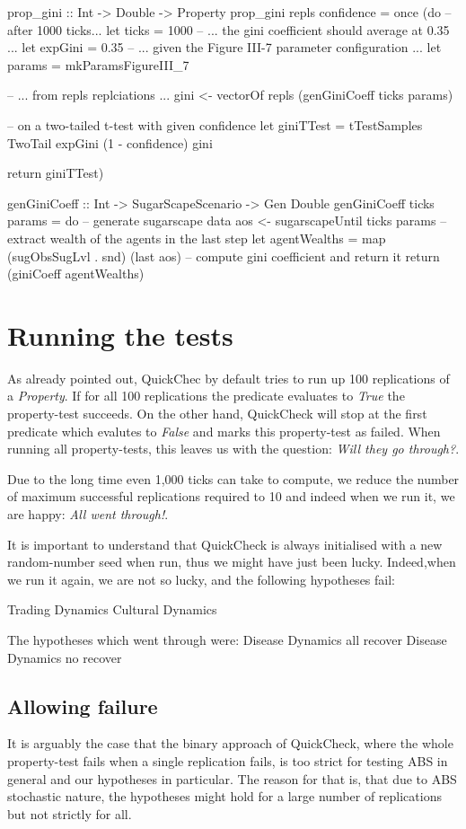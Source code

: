 \begin{HaskellCode}
prop_gini :: Int -> Double -> Property
prop_gini repls confidence = once (do
  -- after 1000 ticks...
  let ticks = 1000
  -- ... the gini coefficient should average at 0.35 ...
  let expGini = 0.35
  -- ... given the Figure III-7 parameter configuration ...
  let params = mkParamsFigureIII_7
  
  -- ... from repls replciations ... 
  gini <- vectorOf repls (genGiniCoeff ticks params)

  -- on a two-tailed t-test with given confidence
  let giniTTest = tTestSamples TwoTail expGini (1 - confidence) gini

  return giniTTest)
  
genGiniCoeff :: Int -> SugarScapeScenario -> Gen Double
genGiniCoeff ticks params = do
  -- generate sugarscape data
  aos <- sugarscapeUntil ticks params
  -- extract wealth of the agents in the last step
  let agentWealths = map (sugObsSugLvl . snd) (last aos)
  -- compute gini coefficient and return it
  return (giniCoeff agentWealths)
\end{HaskellCode}

\section{Running the tests}
As already pointed out, QuickChec by default tries to run up 100 replications of a \textit{Property}. If for all 100 replications the predicate evaluates to \textit{True} the property-test succeeds. On the other hand, QuickCheck will stop at the first predicate which evalutes to \textit{False} and marks this property-test as failed. When running all property-tests, this leaves us with the question: \textit{Will they go through?}.

Due to the long time even 1,000 ticks can take to compute, we reduce the number of maximum successful replications required to 10 and indeed when we run it, we are happy: \textit{All went through!}. 

It is important to understand that QuickCheck is always initialised with a new random-number seed when run, thus we might have just been lucky. Indeed,when we run it again, we are not so lucky, and the following hypotheses fail:

Trading Dynamics
Cultural Dynamics

The hypotheses which went through were:
Disease Dynamics all recover
Disease Dynamics no recover

\subsection{Allowing failure}
It is arguably the case that the binary approach of QuickCheck, where the whole property-test fails when a single replication fails, is too strict for testing ABS in general and our hypotheses in particular. The reason for that is, that due to ABS stochastic nature, the hypotheses might hold for a large number of replications but not strictly for all.


